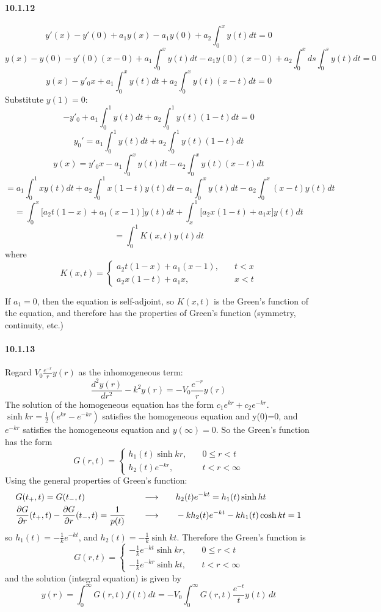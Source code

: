 \documentclass[a4paper]{article}
\begin{document}
\paragraph{10.1.12}
\[
y'(x)-y'(0)+a_1y(x)-a_1y(0)+a_2\int_0^xy(t)dt=0
\]
\[
y(x)-y(0)-y'(0)(x-0)+a_1\int_0^xy(t)dt-a_1y(0)(x-0)+a_2\int_0^xds\int_0^sy(t)dt=0
\]
\[
y(x)-y'_0x+a_1\int_0^xy(t)dt+a_2\int_0^xy(t)(x-t)dt=0
\]
Substitute $y(1)=0$:
\[
-y'_0+a_1\int_0^1y(t)dt+a_2\int_0^1y(t)(1-t)dt=0
\]
\[
y_0'=a_1\int_0^1y(t)dt+a_2\int_0^1y(t)(1-t)dt
\]
\[
y(x)=y'_0x-a_1\int_0^xy(t)dt-a_2\int_0^xy(t)(x-t)dt
\]
\[
=a_1\int_0^1xy(t)dt+a_2\int_0^1x(1-t)y(t)dt-a_1\int_0^xy(t)dt-a_2\int_0^x(x-t)y(t)dt
\]
\[
=\int_0^x\big[a_2t(1-x)+a_1(x-1)\big]y(t)dt+\int_x^1\big[a_2x(1-t)+a_1x\big]y(t)dt
\]
\[
=\int_0^1K(x,t)y(t)dt
\]
where
\[
K(x,t)=
\begin{cases}
a_2t(1-x)+a_1(x-1),\quad & t<x\\
a_2x(1-t)+a_1x,\quad & x<t
\end{cases}
\]

If $a_1=0$, then the equation is self-adjoint, so $K(x,t)$ is the Green's function of the equation, and therefore has the properties of Green's function (symmetry, continuity, etc.)

\paragraph{10.1.13}
Regard $V_0\frac{e^{-r}}{r}y(r)$ as the inhomogeneous term:
\[
\frac{d^2y(r)}{dr^2}-k^2y(r)=-V_0\frac{e^{-r}}{r}y(r)
\]
The solution of the homogeneous equation has the form $c_1e^{kr}+c_2e^{-kr}$. \;$\sinh kr=\frac{1}{2}(e^{kr}-e^{-kr})$ satisfies the homogeneous equation and y(0)=0, and $e^{-kr}$ satisfies the homogeneous equation and $y(\infty)=0$. So the Green's function has the form
\[
G(r,t)=
\begin{cases}
h_1(t)\sinh kr,\quad & 0\leq r<t\\
h_2(t)e^{-kr},\quad & t<r<\infty
\end{cases}
\]
Using the general properties of Green's function:
\begin{alignat*}{3}
    & G(t_+,t)=G(t_-,t)\quad && \longrightarrow\quad && h_2(t)e^{-kt}=h_1(t)\sinh ht \\
    & \frac{\partial G}{\partial r}(t_+,t)-\frac{\partial G}{\partial r}(t_-,t)=\frac{1}{p(t)}\quad && \longrightarrow\quad && -kh_2(t)e^{-kt}-kh_1(t)\cosh kt=1
\end{alignat*}
so $h_1(t)=-\frac{1}{k}e^{-kt}$, and $h_2(t)=-\frac{1}{k}\sinh kt$. Therefore the Green's function is
\[
G(r,t)=
\begin{cases}
-\frac{1}{k}e^{-kt}\sinh kr,\quad & 0\leq r<t\\[2pt]
-\frac{1}{k}e^{-kr}\sinh kt,\quad & t<r<\infty
\end{cases}
\]
and the solution (integral equation) is given by
\[
y(r)=\int_0^\infty G(r,t)f(t)dt=-V_0\int_0^\infty G(r,t)\frac{e^{-t}}{t}y(t)\,dt
\]
\end{document}
